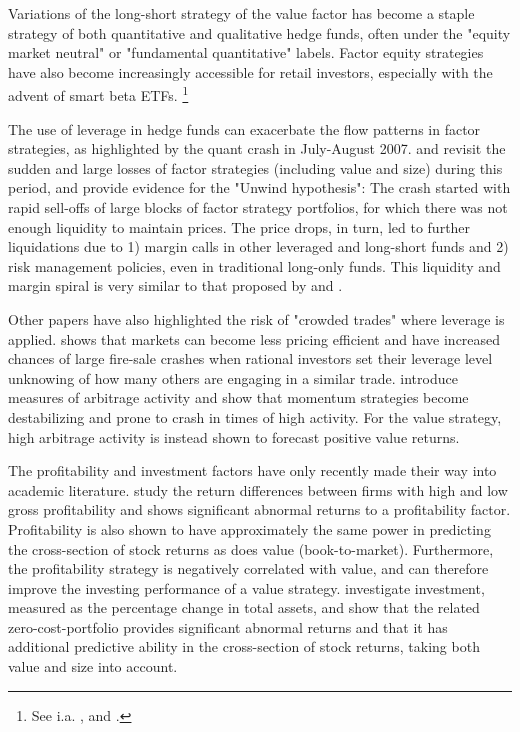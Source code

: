 Variations of the long-short strategy of the value factor has become a staple strategy of both quantitative and qualitative hedge funds, often under the "equity market neutral" or "fundamental quantitative" labels. Factor equity strategies have also become increasingly accessible for retail investors, especially with the advent of smart beta ETFs. \footnote{See i.a. \textcite{Pedersen2015}, \textcite{AQREMN} and \textcite{McKEMN}.} 

The use of leverage in hedge funds can exacerbate the flow patterns in factor strategies, as highlighted by the quant crash in July-August 2007. \textcite{KhandaniLo2011} and \textcite{KhandaniLo2007} revisit the sudden and large losses of factor strategies (including value and size) during this period, and provide evidence for the "Unwind hypothesis": The crash started with rapid sell-offs of large blocks of factor strategy portfolios, for which there was not enough liquidity to maintain prices. The price drops, in turn, led to further liquidations due to 1) margin calls in other leveraged and long-short funds and 2) risk management policies, even in traditional long-only funds. This liquidity and margin spiral is very similar to that proposed by \textcite{Brunnermeier2009} and \textcite{BrunnermeierPedersen2009}.

Other papers have also highlighted the risk of "crowded trades" where leverage is applied. \textcite{Stein2009} shows that markets can become less pricing efficient and have increased chances of large fire-sale crashes when rational investors set their leverage level unknowing of how many others are engaging in a similar trade. \textcite{LouPolk2013} introduce measures of arbitrage activity and show that momentum strategies become destabilizing and prone to crash in times of high activity. For the value strategy, high arbitrage activity is instead shown to forecast positive value returns. 

The profitability and investment factors have only recently made their way into academic literature. \textcite{NovyMarx2013} study the return differences between firms with high and low gross profitability and shows significant abnormal returns to a profitability factor. Profitability is also shown to have approximately the same power in predicting the cross-section of stock returns as does value (book-to-market). Furthermore, the profitability strategy is negatively correlated with value, and can therefore improve the investing performance of a value strategy. \textcite{CooperGulenSchill2008} investigate investment, measured as the percentage change in total assets, and show that the related zero-cost-portfolio provides significant abnormal returns and that it has additional predictive ability in the cross-section of stock returns, taking both value and size into account.

